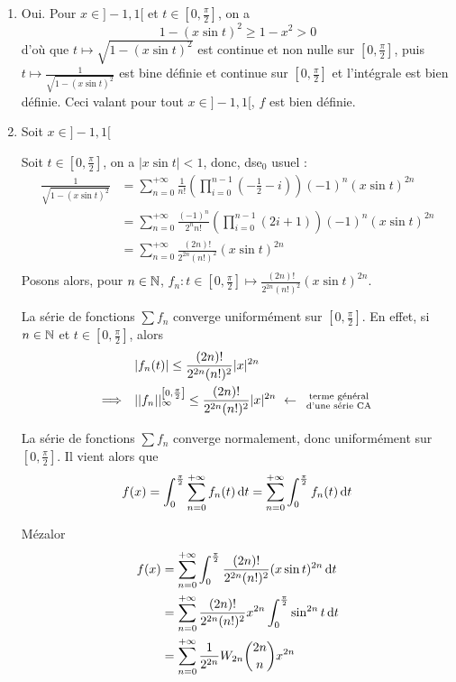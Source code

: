 \begin{sol}
	\begin{enumerate}
		\item Oui. Pour $x\in]-1,1[$ et $t\in\left[0,\frac\pi2\right]$, on a \[1-(x\sin t)^2\geq 1-x^2> 0\]
		d'où que $t\mapsto \sqrt{1-(x\sin t)^2}$ est continue et non nulle sur $\left[0,\frac\pi2\right]$, puis $t\mapsto \frac1{\sqrt{1-(x\sin t)^2}}$ est bine définie et continue sur $\left[0,\frac\pi2\right]$ et l'intégrale est bien définie. Ceci valant pour tout $x\in]-1,1[$, $f$ est bien définie.
		\item Soit $x\in]-1,1[$


		Soit $t\in\left[0,\frac\pi2\right]$, on a $|x\sin t| < 1$, donc, dse${}_0$ usuel : 
		\begin{align*}
			\frac1{\sqrt{1-(x\sin t)^2}} &= \sum_{n=0}^{+\infty}\frac1{n!}\left(\prod_{i=0}^{n-1}\left(-\frac12-i\right)\right)(-1)^n(x\sin t)^{2n}\\
										 &= \sum_{n=0}^{+\infty}\frac{(-1)^n}{2^nn!}\left(\prod_{i=0}^{n-1}(2i+1)\right)(-1)^n(x\sin t)^{2n}\\
										 &= \sum_{n=0}^{+\infty}\frac{(2n)!}{2^{2n}(n!)^2}(x\sin t)^{2n}\\
		\end{align*}
		Posons alors, pour $n\in\mathbb{N}$, $f_n:t\in\left[0,\frac\pi2\right]\mapsto\frac{(2n)!}{2^{2n}(n!)^2}(x\sin t)^{2n}$.


		La série de fonctions $\displaystyle\sum f_n$ converge uniformément sur $\left[0,\frac\pi2\right]$. En effet, si $n\in\mathbb{N}$ et $t\in\left[0,\frac\pi2\right]$, alors 
		\begin{align*}
			& \quad |f_n(t)|\leq \frac{(2n)!}{2^{2n}(n!)^2}|x|^{2n}\\
			\implique & \quad  ||f_n||_\infty^{\left[0,\frac\pi2\right]} \leq \frac{(2n)!}{2^{2n}(n!)^2}|x|^{2n} \ \leftarrow \ \begin{smallmatrix}\text{terme général}\\ \text{d'une série CA}\end{smallmatrix}
		\end{align*}

		La série de fonctions $\displaystyle\sum f_n$ converge normalement, donc uniformément sur $\left[0,\frac\pi2\right]$. Il vient alors que 
		\[f(x)=\int_0^\frac\pi2\sum_{n=0}^{+\infty}f_n(t)\operatorname*{d\!} t = \sum_{n=0}^{+\infty}\int_0^\frac\pi2 f_n(t)\operatorname*{d\!} t \]

		Mézalor 
		\begin{align*}
			f(x) &= \sum_{n=0}^{+\infty}\int_0^\frac\pi2\frac{(2n)!}{2^{2n}(n!)^2}(x\sin t)^{2n}\operatorname*{d\!} t\\
				 &= \sum_{n=0}^{+\infty}\frac{(2n)!}{2^{2n}(n!)^2}x^{2n}\int_0^\frac\pi2\sin^{2n} t\operatorname*{d\!} t\\
				 &= \sum_{n=0}^{+\infty}\frac1{2^{2n}}W_{2n}\binom{2n}nx^{2n}
		\end{align*}


\end{enumerate}
\end{sol}
